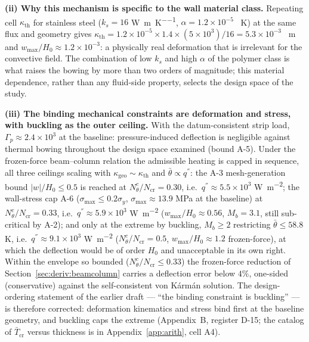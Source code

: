 \textbf{(ii) Why this mechanism is specific to the wall material class.} Repeating cell
$\kappa_{\mathrm{th}}$ for stainless steel ($k_s=16$ \si{\watt\per\metre\per\kelvin},
$\alpha=1.2\times10^{-5}$ \si{\per\kelvin}) at the same flux and geometry gives
$\kappa_{\mathrm{th}}=1.2\times10^{-5}\times1.4\times(5\times10^3)/16=5.3\times10^{-3}$
\si{\per\metre} and $w_{\max}/H_0\approx1.2\times10^{-3}$: a physically real deformation that is
irrelevant for the convective field. The combination of low $k_s$ and high $\alpha$ of the polymer
class is what raises the bowing by more than two orders of magnitude; this material dependence,
rather than any fluid-side property, selects the design space of the study.

\textbf{(iii) The binding mechanical constraints are deformation and stress, with buckling as the
outer ceiling.} With the datum-consistent strip load, $\Gamma_p\approx2.4\times10^{3}$ at the
baseline: pressure-induced deflection is negligible against thermal bowing throughout the design
space examined (bound A-5). Under the frozen-force beam--column relation the admissible heating
is capped in sequence, all three ceilings scaling with
$\kappa_{\mathrm{geo}}\sim\kappa_{\mathrm{th}}$ and $\bar\theta\propto q^{''}$: the A-3
mesh-generation bound $|w|/H_0\le0.5$ is reached at
$N_\theta^c/N_{\mathrm{cr}}=0.30$, i.e.\ $q^{''}\approx5.5\times10^{3}$
\si{\watt\per\square\metre}; the wall-stress cap A-6 ($\sigma_{\max}\le0.2\sigma_y$,
$\sigma_{\max}\approx13.9$ MPa at the baseline) at
$N_\theta^c/N_{\mathrm{cr}}=0.33$, i.e.\ $q^{''}\approx5.9\times10^{3}$
\si{\watt\per\square\metre} ($w_{\max}/H_0\approx0.56$, $M_b=3.1$, still sub-critical by A-2);
and only at the extreme by buckling, $M_b\ge2$ restricting $\bar\theta\le58.8$ K, i.e.\
$q^{''}\approx9.1\times10^{3}$ \si{\watt\per\square\metre}
($N_\theta^c/N_{\mathrm{cr}}=0.5$, $w_{\max}/H_0\approx1.2$ frozen-force), at which the
deflection would be of order $H_0$ and unacceptable in its own right. Within the envelope so
bounded ($N_\theta^c/N_{\mathrm{cr}}\le0.33$) the frozen-force reduction of
Section~\ref{sec:deriv:beamcolumn} carries a deflection error below $4\%$, one-sided
(conservative) against the self-consistent von K\'arm\'an solution. The design-ordering
statement of the earlier draft --- ``the binding constraint is buckling'' --- is therefore
corrected: deformation kinematics and stress bind first at the baseline geometry, and buckling
caps the extreme (Appendix~B, register D-15; the catalog of $\bar T_{\mathrm{cr}}$ versus
thickness is in Appendix~\ref{app:arith}, cell A4).

